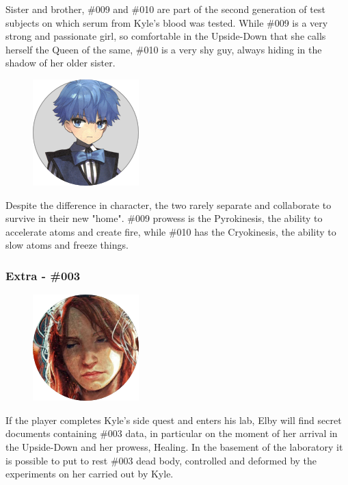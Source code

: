 Sister and brother, \#009 and \#010 are part of the second generation of test subjects on which serum from Kyle's blood was tested. While \#009 is a very strong and passionate girl, so comfortable in the Upside-Down that she calls herself the Queen of the same, \#010 is a very shy guy, always hiding in the shadow of her older sister.\\

\begin{figure}
	\centering
	\includegraphics[width=0.5\linewidth]{images/characters/010.png}
\end{figure}

Despite the difference in character, the two rarely separate and collaborate to survive in their new "home". \#009 prowess is the Pyrokinesis, the ability to accelerate atoms and create fire, while \#010 has the Cryokinesis, the ability to slow atoms and freeze things.\\


\subsubsection{Extra - \#003}

\begin{figure}
	\centering
	\includegraphics[width=0.55\linewidth]{images/characters/003.png}
\end{figure}

If the player completes Kyle's side quest and enters his lab, Elby will find secret documents containing \#003 data, in particular on the moment of her arrival in the Upside-Down and her prowess, Healing. In the basement of the laboratory it is possible to put to rest \#003 dead body, controlled and deformed by the experiments on her carried out by Kyle.
